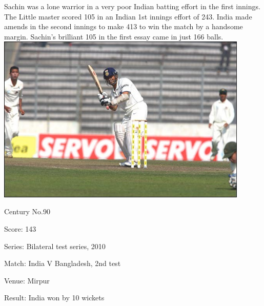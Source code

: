 \documentclass[11pt, a4paper]{article}
\begin{document}
Sachin was a lone warrior in a very poor Indian batting effort in the first innings. The Little master scored 105 in an Indian 1st innings effort of 243. India made amends in the second innings to make 413 to win the match by a handsome margin. Sachin's brilliant 105 in the first essay came in just 166 balls.
\newpage
\includegraphics[width=0.9\textwidth]{pics/90.jpg}

Century No.90 

Score: 143 

Series: Bilateral test series, 2010 

Match: India V Bangladesh, 2nd test 

Venue: Mirpur 

Result: India won by 10 wickets 
\end{document}
